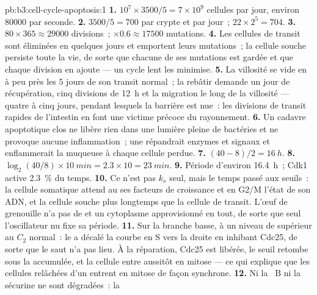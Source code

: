 \begin{solution}{pb:b3:cell-cycle-apoptosis:1}
\textbf{1.} $10^{7}\times 3500/5 = 7\times 10^{9}$ cellules par jour,
environ \num{80000} par seconde.
\textbf{2.} $3500/5 = 700$ par crypte et par jour~; $22\times 2^{5} = 704$.
\textbf{3.} $80\times 365 \approx \num{29000}$ divisions~; $\times 0.6
\approx \num{17500}$ mutations.
\textbf{4.} Les cellules de transit sont éliminées en quelques jours et
emportent leurs mutations~; la cellule souche persiste toute la vie, de
sorte que chacune de ses mutations est gardée et que chaque division en
ajoute --- un cycle lent les minimise.
\textbf{5.} La villosité se vide en à peu près les $5$ jours de son
transit normal~; la rebâtir demande un jour de récupération, cinq
divisions de \qty{12}{h} et la migration le long de la villosité ---
quatre à cinq jours, pendant lesquels la barrière est nue~: les
divisions de transit rapides de l'intestin en font une victime précoce
du rayonnement.
\textbf{6.} Un cadavre apoptotique clos ne libère rien dans une lumière
pleine de bactéries et ne provoque aucune inflammation~; une 
répandrait enzymes et signaux et enflammerait la muqueuse à chaque
cellule perdue.
\textbf{7.} $(40 - 8)/2 = \qty{16}{h}$.
\textbf{8.} $\log_{2}(40/8)\times \qty{10}{min} = 2.3\times 10 =
\qty{23}{min}$.
\textbf{9.} Période d'environ \qty{16.4}{h}~; Cdk1 active \qty{2.3}{\%}
du temps.
\textbf{10.} Ce n'est pas $k_{s}$ seul, mais le temps passé aux
seuils~: la cellule somatique attend au  ses
facteurs de croissance et en G2/M l'état de son ADN, et la cellule
souche plus longtemps que la cellule de transit. L'œuf de grenouille
n'a pas de  et un cytoplasme approvisionné en tout,
de sorte que seul l'oscillateur nu fixe sa période.
\textbf{11.} Sur la branche basse, à un niveau de  supérieur au
$C_{2}$ normal~: le  a décalé la courbe en S vers la
droite en inhibant Cdc25, de sorte que le saut n'a pas lieu. À la
réparation, Cdc25 est libérée, le seuil retombe sous la 
accumulée, et la cellule entre aussitôt en mitose --- ce qui explique
que les cellules relâchées d'un  entrent en mitose de
façon synchrone.
\textbf{12.} Ni la ~B ni la sécurine ne sont dégradées~: la

\end{solution}
